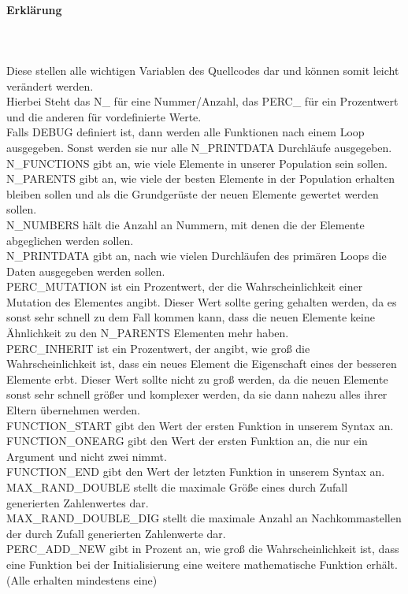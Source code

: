 \documentclass[a4paper,12pt]{article}
\begin{document}
\paragraph{Erklärung}\hfill\\\\
Diese stellen alle wichtigen Variablen des Quellcodes dar und können somit leicht verändert werden.\\ Hierbei Steht das N\_ für eine Nummer/Anzahl, das PERC\_ für ein Prozentwert und die anderen für vordefinierte Werte. \\
Falls DEBUG definiert ist, dann werden alle Funktionen nach einem Loop ausgegeben. Sonst werden sie nur alle N\_PRINTDATA Durchläufe ausgegeben. \\

\noindent N\_FUNCTIONS gibt an, wie viele Elemente in unserer Population sein sollen.\\
N\_PARENTS gibt an, wie viele der besten Elemente in der Population erhalten bleiben sollen und als die Grundgerüste der neuen Elemente gewertet werden sollen.\\
N\_NUMBERS hält die Anzahl an Nummern, mit denen die der Elemente abgeglichen werden sollen. \\
N\_PRINTDATA gibt an, nach wie vielen Durchläufen des primären Loops die Daten ausgegeben werden sollen. \\
PERC\_MUTATION ist ein Prozentwert, der die Wahrscheinlichkeit einer Mutation des Elementes angibt. Dieser Wert sollte gering gehalten werden, da es sonst sehr schnell zu dem Fall kommen kann, dass die neuen Elemente keine Ähnlichkeit zu den N\_PARENTS Elementen mehr haben. \\
PERC\_INHERIT ist ein Prozentwert, der angibt, wie groß die Wahrscheinlichkeit ist, dass ein neues Element die Eigenschaft eines der besseren Elemente erbt. Dieser Wert sollte nicht zu groß werden, da die neuen Elemente sonst sehr schnell größer und komplexer werden, da sie dann nahezu alles ihrer Eltern übernehmen werden. \\
FUNCTION\_START gibt den Wert der ersten Funktion in unserem Syntax an.\\
FUNCTION\_ONEARG gibt den Wert der ersten Funktion an, die nur ein Argument und nicht zwei nimmt. \\
FUNCTION\_END gibt den Wert der letzten Funktion in unserem Syntax an.\\
MAX\_RAND\_DOUBLE stellt die maximale Größe eines durch Zufall generierten Zahlenwertes dar.\\
MAX\_RAND\_DOUBLE\_DIG stellt die maximale Anzahl an Nachkommastellen der durch Zufall generierten Zahlenwerte dar. \\
PERC\_ADD\_NEW gibt in Prozent an, wie groß die Wahrscheinlichkeit ist, dass eine Funktion bei der Initialisierung eine weitere mathematische Funktion erhält. (Alle erhalten mindestens eine)\\
\end{document}
